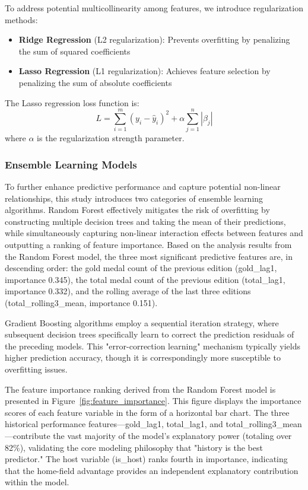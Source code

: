 \documentclass{mcmthesis}
\begin{document}
To address potential multicollinearity among features, we introduce regularization methods:
\begin{itemize}
    \item \textbf{Ridge Regression} (L2 regularization): Prevents overfitting by penalizing the sum of squared coefficients
    \item \textbf{Lasso Regression} (L1 regularization): Achieves feature selection by penalizing the sum of absolute coefficients
\end{itemize}

The Lasso regression loss function is:
\begin{equation}
    L = \sum_{i=1}^{m}(y_i - \hat{y}_i)^2 + \alpha \sum_{j=1}^{n}|\beta_j|
\end{equation}
where $\alpha$ is the regularization strength parameter.

\subsubsection{Ensemble Learning Models}
To further enhance predictive performance and capture potential non-linear relationships, this study introduces two categories of ensemble learning algorithms. Random Forest effectively mitigates the risk of overfitting by constructing multiple decision trees and taking the mean of their predictions, while simultaneously capturing non-linear interaction effects between features and outputting a ranking of feature importance. Based on the analysis results from the Random Forest model, the three most significant predictive features are, in descending order: the gold medal count of the previous edition (gold\_lag1, importance 0.345), the total medal count of the previous edition (total\_lag1, importance 0.332), and the rolling average of the last three editions (total\_rolling3\_mean, importance 0.151).

Gradient Boosting algorithms employ a sequential iteration strategy, where subsequent decision trees specifically learn to correct the prediction residuals of the preceding models. This "error-correction learning" mechanism typically yields higher prediction accuracy, though it is correspondingly more susceptible to overfitting issues.

The feature importance ranking derived from the Random Forest model is presented in Figure~\ref{fig:feature_importance}. This figure displays the importance scores of each feature variable in the form of a horizontal bar chart. The three historical performance features—gold\_lag1, total\_lag1, and total\_rolling3\_mean—contribute the vast majority of the model's explanatory power (totaling over 82\%), validating the core modeling philosophy that "history is the best predictor." The host variable (is\_host) ranks fourth in importance, indicating that the home-field advantage provides an independent explanatory contribution within the model.
\end{document}

